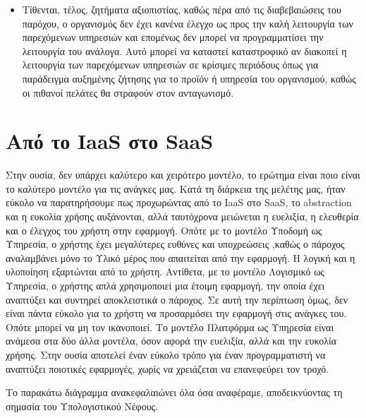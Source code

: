 \documentclass{article}
\begin{document}
\begin{itemize}
\item Τίθενται, τέλος, ζητήματα αξιοπιστίας, καθώς πέρα από τις διαβεβαιώσεις του παρόχου, ο οργανισμός δεν έχει κανένα έλεγχο ως προς την καλή λειτουργία των παρεχόμενων υπηρεσιών και επομένως δεν μπορεί να προγραμματίσει την λειτουργία του ανάλογα. Αυτό μπορεί να καταστεί καταστροφικό αν διακοπεί η λειτουργία των παρεχόμενων υπηρεσιών σε κρίσιμες περιόδους όπως για παράδειγμα αυξημένης ζήτησης για το προϊόν ή υπηρεσία του οργανισμού, καθώς οι πιθανοί πελάτες θα στραφούν στον ανταγωνισμό.
\end{itemize}




\section{Από το IaaS στο SaaS}
Στην ουσία, δεν υπάρχει καλύτερο και χειρότερο μοντέλο, το ερώτημα είναι ποιο είναι το καλύτερο μοντέλο για τις ανάγκες μας. Κατά τη διάρκεια της μελέτης μας, ήταν εύκολο να παρατηρήσουμε πως προχωρώντας από το IaaS στο SaaS, το abstraction και η ευκολία χρήσης αυξάνονται, αλλά ταυτόχρονα μειώνεται η ευελιξία, η ελευθερία και ο έλεγχος του χρήστη στην εφαρμογή. Οπότε με το μοντέλο Υποδομή ως Υπηρεσία, ο χρήστης έχει μεγαλύτερες ευθύνες και υποχρεώσεις ,καθώς ο πάροχος αναλαμβάνει μόνο το Υλικό μέρος που απαιτείται από την εφαρμογή. Η λογική και η υλοποίηση εξαρτώνται από το χρήστη. Αντίθετα, με το μοντέλο Λογισμικό ως Υπηρεσία, ο χρήστης απλά χρησιμοποιεί μια έτοιμη εφαρμογή, την οποία έχει αναπτύξει και συντηρεί αποκλειστικά ο πάροχος. Σε αυτή την περίπτωση όμως, δεν είναι πάντα εύκολο για το χρήστη να προσαρμόσει την εφαρμογή στις ανάγκες του. Οπότε μπορεί να μη τον ικανοποιεί. Το μοντέλο Πλατφόρμα ως Υπηρεσία είναι ανάμεσα στα δύο άλλα μοντέλα, όσον αφορά την ευελιξία, αλλά και την ευκολία χρήσης. Στην ουσία αποτελεί έναν εύκολο τρόπο για έναν προγραμματιστή να αναπτύξει ποιοτικές εφαρμογές, χωρίς να χρειάζεται να επανεφεύρει τον τροχό.

Το παρακάτω διάγραμμα ανακεφαλαιώνει όλα όσα αναφέραμε, αποδεικνύοντας τη σημασία του Υπολογιστικού Νέφους. 
\end{document}
